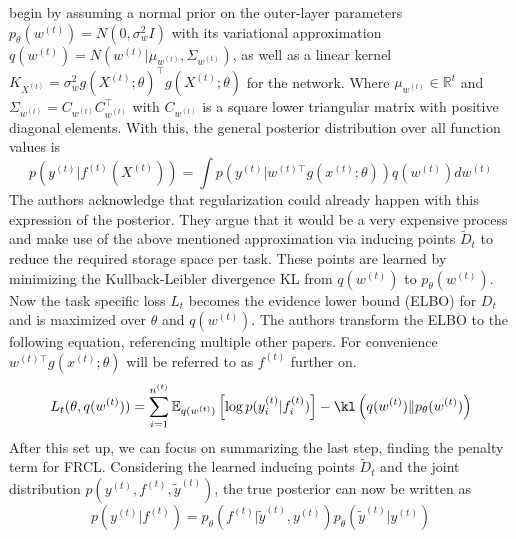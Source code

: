 \setlength{\parindent}{0pt}
\citeauthor{titsias2020functionalregularisationcontinuallearning} begin by assuming a normal prior on the outer-layer parameters $p_\theta(w^{(t)}) = N(0, \sigma^2_wI)$ with its variational approximation $q(w^{(t)}) = N(w^{(t)}|\mu_{w^{(t)}}, \Sigma_{w^{(t)}})$, as well as a linear kernel \cite{Ludkovski2025} $K_{X^{(t)}} = \sigma_w^2g(X^{(t)};\theta)^\top g(X^{(t)};\theta)$ for the network. Where $\mu_{w^{(t)}} \in \mathbb{R}^t$ and $\Sigma_{w^{(t)}} = C_{w^{(t)}}C_{w^{(t)}}^\top$ with $C_{w^{(t)}}$ is a square lower triangular matrix with positive diagonal elements. With this, the general posterior distribution over all function values is
\begin{equation}
	p(y^{(t)}|f^{(t)}(X^{(t)})) = \int p\left(y^{(t)}|w^{(t)\top} g(x^{(t)};\theta)\right)q(w^{(t)}) dw^{(t)}
\end{equation}
The authors acknowledge that regularization could already happen with this expression of the posterior. They argue that it would be a very expensive process and make use of the above mentioned approximation via inducing points $\tilde{D}_t$ to reduce the required storage space per task. These points are learned by minimizing the Kullback-Leibler divergence KL from $q(w^{(t)})$ to $p_\theta(w^{(t)})$. Now the task specific loss $L_t$ becomes the evidence lower bound (ELBO) \cite{Blei_2017} for $D_t$ and is maximized over $\theta$ and $q(w^{(t)})$. The authors transform the ELBO to the following equation, referencing multiple other papers. For convenience $w^{(t)\top} g(x^{(t)};\theta)$ will be referred to as $f^{(t)}$ further on.
\begin{equation}\label{elbo}
	L_t(\theta, q(w^{(t)})) = \sum_{i=1}^{n^{(t)}} \mathbb{E}_{q(w^{(t)})}\left[\log p(y_i^{(t)}|f_i^{(t)})\right] - \kl\left(q(w^{(t)})\Vert p_\theta(w^{(t)})\right)
\end{equation}
After this set up, we can focus on summarizing the last step, finding the penalty term for FRCL. Considering the learned inducing points $\tilde{D}_t$ and the joint distribution \(p(y^{(t)}, f^{(t)},\allowbreak \tilde{y}^{(t)})\), the true posterior can now be written as 
\begin{equation}
	p(y^{(t)}|f^{(t)}) = p_\theta(f^{(t)}|\tilde{y}^{(t)}, y^{(t)})p_\theta(\tilde{y}^{(t)}|y^{(t)})
\end{equation}

